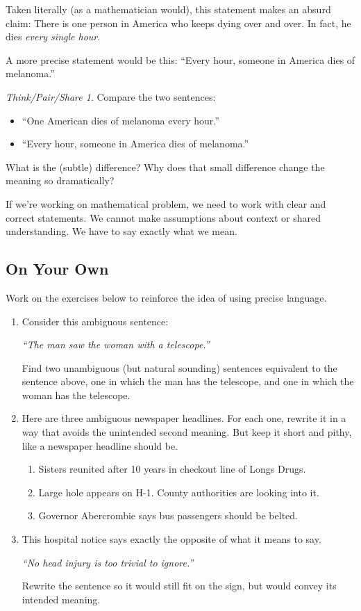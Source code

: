 \documentclass[10pt, reqno]{amsart}
\theoremstyle{remark}
\newtheorem*{thinkpair*}{Think/Pair/Share}
\theoremstyle{definition}
\numberwithin{equation}{section}  %
\begin{document}
Taken literally (as a mathematician would), this statement makes an absurd claim:  There is one person in America who keeps dying over and over.  In fact, he dies \emph{every single hour}.

A more precise statement would be this:
``Every hour, someone in America dies of melanoma.''

\begin{thinkpair*}
Compare the two sentences:
\begin{itemize}
\item
``One American dies of melanoma every hour.''
\item
``Every hour, someone in America dies of melanoma.''
\end{itemize}
What is the (subtle) difference?  Why does that small difference change the meaning so dramatically?

\end{thinkpair*}

 If we're working on mathematical problem, we need to work with clear and correct statements.  We cannot make assumptions about context or shared understanding.  We have to say exactly what we mean.

\subsection*{On Your Own}
Work on the exercises below to reinforce the idea of using precise language.
\begin{enumerate}
\item
Consider this ambiguous sentence:
\begin{center}
\emph{``The man saw
the woman with a telescope.''} 
\end{center}
Find two unambiguous (but natural sounding) sentences equivalent to the sentence above, one in which the
 man has the telescope, and one in which  the woman
has the telescope.
 
 
 \item
Here are three ambiguous newspaper headlines.  For each one, rewrite it in a way that avoids the unintended second meaning.  But keep it short and pithy, like a newspaper headline should be.

\begin{enumerate}
\item
Sisters reunited after 10 years in checkout line of Longs Drugs.
\item
Large hole appears on H-1.  County authorities are looking into it.
\item
Governor Abercrombie says bus passengers should be belted.

\end{enumerate}


 \item
This hospital notice says exactly the opposite of what it means to say.
 \begin{center}
\emph{``No head injury is too trivial to ignore.''} 
\end{center}
Rewrite the sentence so it would still fit on the sign, but would convey its intended meaning.



\end{enumerate}
\end{document}
